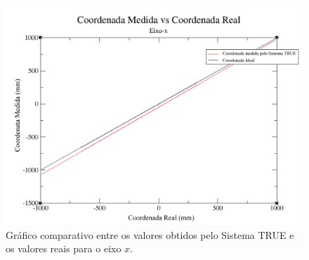 	\begin{figure}[htb]
		\begin{center}
			\includegraphics[scale=0.4]{figuras/5.Testes/grafico-eixo-x.png}
		\end{center}
		\caption{Gráfico comparativo entre os valores obtidos pelo Sistema TRUE e os valores reais para o eixo $\displaystyle x$.}
		\label{fig:grafico-eixox}
	\end{figure}
